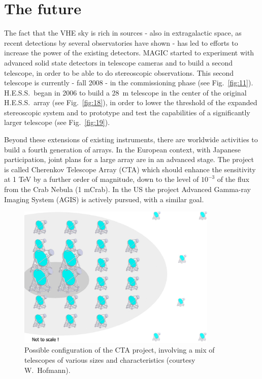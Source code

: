 \documentclass{svjour3x}                     %
\newcommand{\hess}{H.E.S.S.}
\begin{document}
\section{The future}

The fact that the VHE sky is rich in sources - also in extragalactic space, as
recent detections by several observatories have shown - has led to efforts to
increase the power of the existing detectors. MAGIC started to experiment with
advanced solid state detectors in telescope cameras and to build a second
telescope, in order to be able to do stereoscopic observations. This second
telescope is currently - fall 2008 - in the commissioning phase (see
Fig.~\ref{fig:11}). \hess\ began in 2006 to build a 28~m telescope in the
center of the original \hess\ array (see Fig.~\ref{fig:18}), in order to lower
the threshold of the expanded stereoscopic system and to prototype and test the
capabilities of a significantly larger telescope (see Fig.~\ref{fig:19}).

Beyond these extensions of existing instruments, there are worldwide activities
to build a fourth generation of arrays. In the European context, with Japanese
participation, joint plans for a large array are in an advanced stage. The
project is called Cherenkov Telescope Array (CTA) \cite{cta} which should
enhance the sensitivity at 1 TeV by a further order of magnitude, down to the
level of $10^{-3}$ of the flux from the Crab Nebula (1 mCrab). In the US the
project Advanced Gamma-ray Imaging System (AGIS) \cite{agis} is actively
pursued, with a similar goal.

\begin{figure}
\begin{center}
  \includegraphics[width=0.85\textwidth]{CTA_scheme_x.eps}
\end{center}
  \caption{Possible configuration of the CTA project, involving a mix of
   telescopes of various sizes and characteristics (courtesy W.~Hofmann).}
  \label{fig:20}       %
\end{figure}
\end{document}
